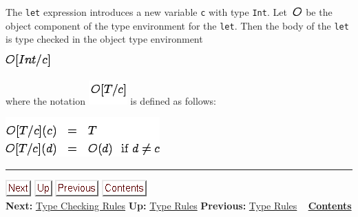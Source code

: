 \documentclass[]{article}
\begin{document}
The \texttt{let} expression introduces a new variable \texttt{c} with
type \texttt{Int}. Let \includegraphics{img56.png} be the object
component of the type environment for the \texttt{let}. Then the body of
the \texttt{let} is type checked in the object type environment \\

\includegraphics{img66.png}

where the notation \includegraphics{img67.png} is defined as follows:

\includegraphics{img68.png}

\begin{center}\rule{3in}{0.4pt}\end{center}

\href{node43.html}{\includegraphics{next.png}}
\href{node41.html}{\includegraphics{up.png}}
\href{node41.html}{\includegraphics{prev.png}}
\href{node1.html}{\includegraphics{contents.png}} \\ \textbf{Next:}
\href{node43.html}{Type Checking Rules} \textbf{Up:}
\href{node41.html}{Type Rules} \textbf{Previous:}
\href{node41.html}{Type Rules} ~ \textbf{\href{node1.html}{Contents}}
\end{document}
